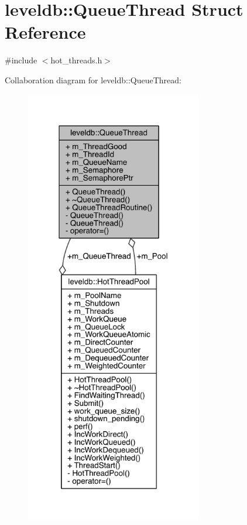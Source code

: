 \hypertarget{structleveldb_1_1_queue_thread}{}\section{leveldb\+:\+:Queue\+Thread Struct Reference}
\label{structleveldb_1_1_queue_thread}


{\ttfamily \#include $<$hot\+\_\+threads.\+h$>$}



Collaboration diagram for leveldb\+:\+:Queue\+Thread\+:\nopagebreak
\begin{figure}[H]
\begin{center}
\leavevmode
\includegraphics[width=219pt]{structleveldb_1_1_queue_thread__coll__graph}
\end{center}
\end{figure}
